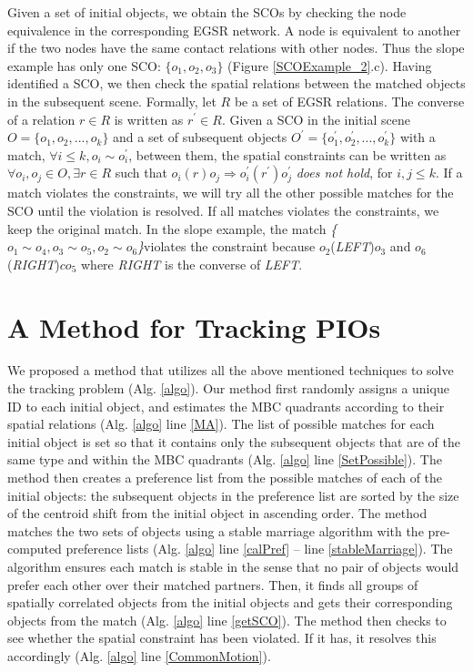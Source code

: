 \documentclass[letterpaper]{article}
\begin{document}
Given a set of initial objects, we obtain the SCOs by checking the node equivalence in the corresponding EGSR network. A node is equivalent to another if the two nodes have the same contact relations with other nodes. Thus the slope example has only one SCO: $\{o_1, o_2, o_3\}$ (Figure \ref{SCOExample_2}.c). Having identified a SCO, we then check the spatial relations between the matched objects in the subsequent scene. Formally, let $R$ be a set of EGSR relations. The converse of a relation $r \in R$ is written as $r^{\prime} \in R$. Given a SCO in the initial scene $O = \{o_1, o_2, ... , o_k\}$ and a set of subsequent objects $O^\prime = \{o^{\prime}_1, o^{\prime}_2, ..., o^{\prime}_k \}$ with a match, $\forall i\leq k, o_i \sim o^{\prime}_i$, between them, the spatial constraints can be written as $\forall o_i,o_j\in O, \exists r\in R$ such that $o_i (r) o_j \Rightarrow o^{\prime}_i (r^{\prime}) o^{\prime}_j$ \emph{does not hold}, for $i,j \leq k$. If a match violates the constraints, we will try all the other possible matches for the SCO until the violation is resolved. If all matches violates the constraints, we keep the original match. In the slope example, the match \emph{\{$o_1\sim o_4, o_3\sim o_5, o_2 \sim o_6$\}}violates the constraint because $o_2$(\emph{LEFT})$o_3$ and $o_6$(\emph{RIGHT})$co_5$ where \emph{RIGHT} is the converse of \emph{LEFT}.




\section{A Method for Tracking PIOs}

We proposed a method that utilizes all the above mentioned techniques to solve the tracking problem (Alg. \ref{algo}). %
Our method first randomly assigns a unique ID to each initial object, and estimates the MBC quadrants according to their spatial relations (Alg. \ref{algo} line \ref{MA}). The list of possible matches for each initial object is set so that it contains only the subsequent objects that are of the same type and within the MBC quadrants (Alg. \ref{algo} line \ref{SetPossible}). The method then creates a preference list from the possible matches of each of the initial objects: the subsequent objects in the preference list are sorted by the size of the centroid shift from the initial object in ascending order. The method matches the two sets of objects using a stable marriage algorithm \cite{gale1962college} with the pre-computed preference lists (Alg. \ref{algo} line \ref{calPref} -- line \ref{stableMarriage}). The algorithm ensures each match is stable in the sense that no pair of objects would prefer each other over their matched partners. Then, it finds all groups of spatially correlated objects from the initial objects and gets their corresponding objects from the match (Alg. \ref{algo} line \ref{getSCO}). The method then checks to see whether the spatial constraint  has been violated. If it has, it resolves this accordingly (Alg. \ref{algo} line \ref{CommonMotion}).
\vspace{-4mm}
\end{document}
